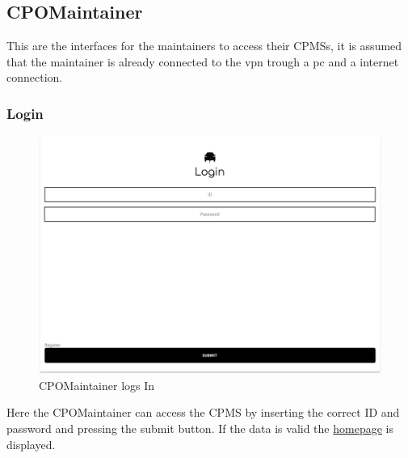 \subsection{CPOMaintainer}
This are the interfaces for the maintainers to access their \acp{CPMS}, it is assumed that the maintainer is already connected to the vpn trough a pc and a internet connection.
\subsubsection{Login}
\begin{figure}[H]
    \centering
    \includegraphics[keepaspectratio, width=15cm]{Mockup/CPMSSiteInterface/Login.png}
    \caption{\ac{CPO}Maintainer logs In}
    \label{cpo:Login}
\end{figure}
Here the \ac{CPO}Maintainer can access the \ac{CPMS} by inserting the correct ID and password and pressing the submit button. If the data is valid the \hyperref[cpo:Homepage]{homepage} is displayed.
